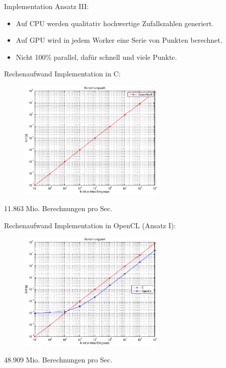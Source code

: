 \documentclass{beamer}
\begin{document}
\begin{frame}{Implementation}
	Ansatz III: \\
	
	\begin{itemize}
		\item Auf CPU werden qualitativ hochwertige Zufallszahlen generiert.
		\item Auf GPU wird in jedem Worker eine Serie von Punkten berechnet.
		\item Nicht 100\% parallel, dafür schnell und viele Punkte.
	\end{itemize}
\end{frame}

\begin{frame}{Rechenaufwand}
	Implementation in C:
	\begin{figure}
		\centering
		\includegraphics[width=7cm]{images/Berechnungszeit_C.eps}
	\end{figure}
	11.863 Mio. Berechnungen pro Sec.
\end{frame}
\begin{frame}{Rechenaufwand}
	Implementation in OpenCL (Ansatz I):
	\begin{figure}
		\centering
		\includegraphics[width=7cm]{images/Berechnungszeit_OpenCL.eps} 
	\end{figure}
	48.909 Mio. Berechnungen pro Sec.
\end{frame}
\end{document}
